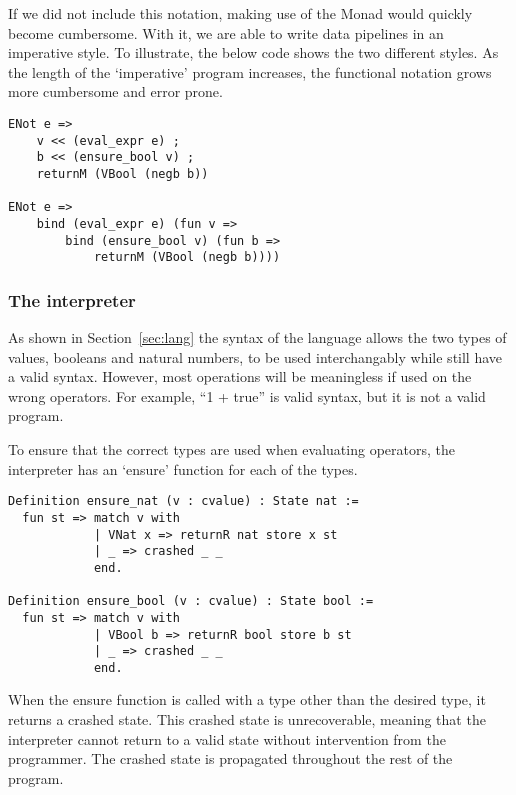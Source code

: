 If we did not include this notation, making use of the Monad would quickly
become cumbersome. With it, we are able to write data pipelines in an
imperative style. To illustrate, the below code shows the two
different styles. As the length of the `imperative' program increases, the
functional notation grows more cumbersome and error prone.

\begin{verbatim}
ENot e =>
	v << (eval_expr e) ;
	b << (ensure_bool v) ;
	returnM (VBool (negb b))

ENot e =>
	bind (eval_expr e) (fun v =>
		bind (ensure_bool v) (fun b =>
			returnM (VBool (negb b))))
\end{verbatim}


\subsubsection{The interpreter}
As shown in Section~\ref{sec:lang} the syntax of the language allows the two
types of values, booleans and natural numbers, to be used interchangably while
still have a valid syntax. However, most operations will be meaningless if used
on the wrong operators. For example, ``1 + true'' is valid syntax, but it is 
not a valid program.

To ensure that the correct types are used when evaluating operators,
the interpreter has an `ensure' function for each of the types. 

\begin{verbatim}
Definition ensure_nat (v : cvalue) : State nat :=
  fun st => match v with
            | VNat x => returnR nat store x st
            | _ => crashed _ _
            end.
            
Definition ensure_bool (v : cvalue) : State bool :=
  fun st => match v with
            | VBool b => returnR bool store b st
            | _ => crashed _ _
            end.
\end{verbatim}

When the ensure function is called with a type other than the desired type, it
returns a crashed state. This crashed state is unrecoverable, meaning that the
interpreter cannot return to a valid state without intervention from the
programmer. The crashed state is propagated throughout the rest of the program.

